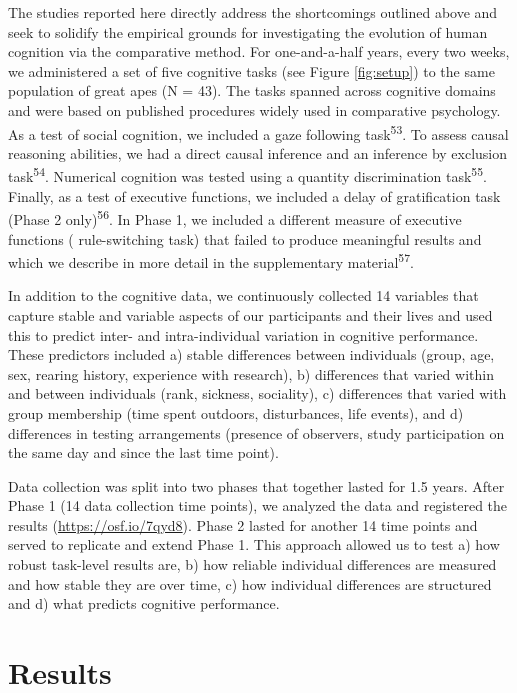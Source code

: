 \documentclass[
  man,floatsintext]{apa6}
\begin{document}
The studies reported here directly address the shortcomings outlined above and seek to solidify the empirical grounds for investigating the evolution of human cognition via the comparative method. For one-and-a-half years, every two weeks, we administered a set of five cognitive tasks (see Figure \ref{fig:setup}) to the same population of great apes (N = 43). The tasks spanned across cognitive domains and were based on published procedures widely used in comparative psychology. As a test of social cognition, we included a gaze following task\textsuperscript{53}. To assess causal reasoning abilities, we had a direct causal inference and an inference by exclusion task\textsuperscript{54}. Numerical cognition was tested using a quantity discrimination task\textsuperscript{55}. Finally, as a test of executive functions, we included a delay of gratification task (Phase 2 only)\textsuperscript{56}. In Phase 1, we included a different measure of executive functions ( rule-switching task) that failed to produce meaningful results and which we describe in more detail in the supplementary material\textsuperscript{57}.

In addition to the cognitive data, we continuously collected 14 variables that capture stable and variable aspects of our participants and their lives and used this to predict inter- and intra-individual variation in cognitive performance. These predictors included a) stable differences between individuals (group, age, sex, rearing history, experience with research), b) differences that varied within and between individuals (rank, sickness, sociality), c) differences that varied with group membership (time spent outdoors, disturbances, life events), and d) differences in testing arrangements (presence of observers, study participation on the same day and since the last time point).

Data collection was split into two phases that together lasted for 1.5 years. After Phase 1 (14 data collection time points), we analyzed the data and registered the results (\url{https://osf.io/7qyd8}). Phase 2 lasted for another 14 time points and served to replicate and extend Phase 1. This approach allowed us to test a) how robust task-level results are, b) how reliable individual differences are measured and how stable they are over time, c) how individual differences are structured and d) what predicts cognitive performance.

\hypertarget{results}{%
\section{Results}\label{results}}
\end{document}
